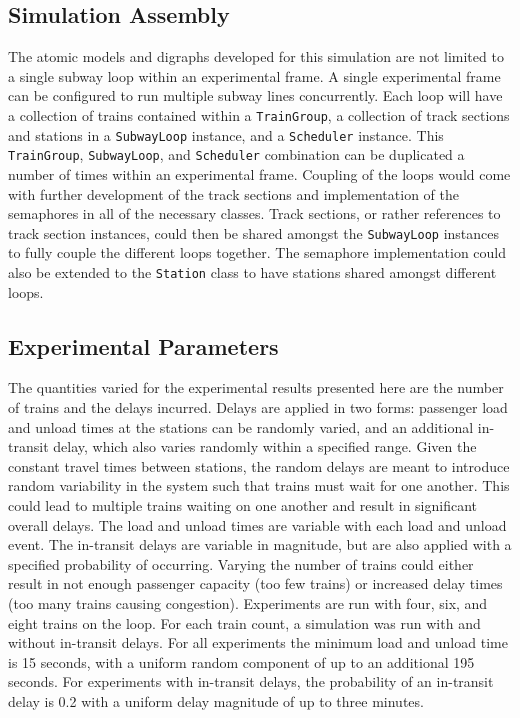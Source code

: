 \subsection{Simulation Assembly}
The atomic models and digraphs developed for this simulation are not limited to a single subway loop within an experimental frame.  A single experimental frame can be configured to run multiple subway lines concurrently.  Each loop will have a collection of trains contained within a \texttt{TrainGroup}, a collection of track sections and stations in a \texttt{SubwayLoop} instance, and a \texttt{Scheduler} instance.  This \texttt{TrainGroup}, \texttt{SubwayLoop}, and \texttt{Scheduler} combination can be duplicated a number of times within an experimental frame.  Coupling of the loops would come with further development of the track sections and implementation of the semaphores in all of the necessary classes.  Track sections, or rather references to track section instances, could then be shared amongst the \texttt{SubwayLoop} instances to fully couple the different loops together.  The semaphore implementation could also be extended to the \texttt{Station} class to have stations shared amongst different loops.

\subsection{Experimental Parameters}
The quantities varied for the experimental results presented here are the number of trains and the delays incurred.  Delays are applied in two forms: passenger load and unload times at the stations can be randomly varied, and an additional in-transit delay, which also varies randomly within a specified range. Given the constant travel times between stations, the random delays are meant to introduce random variability in the system such that trains must wait for one another.  This could lead to multiple trains waiting on one another and result in significant overall delays.  The load and unload times are variable with each load and unload event.  The in-transit delays are variable in magnitude, but are also applied with a specified probability of occurring. Varying the number of trains could either result in not enough passenger capacity (too few trains) or increased delay times (too many trains causing congestion).  Experiments are run with four, six, and eight trains on the loop.  For each train count, a simulation was run with and without in-transit delays. For all experiments the minimum load and unload time is 15 seconds, with a uniform random component of up to an additional 195 seconds.  For experiments with in-transit delays, the probability of an in-transit delay is 0.2 with a uniform delay magnitude of up to three minutes.
